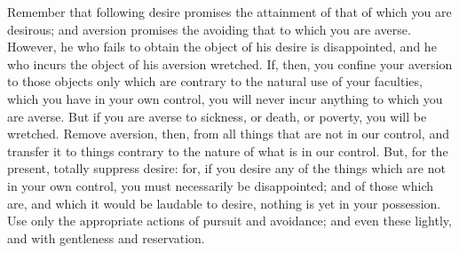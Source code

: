 Remember that following desire promises the attainment of that of which you are
desirous; and  aversion promises  the avoiding  that to  which you  are averse.
However, he who fails  to obtain the object of his  desire is disappointed, and
he who incurs the  object of his aversion wretched. If,  then, you confine your
aversion to those  objects only which are  contrary to the natural  use of your
faculties, which you have in your own control, you will never incur anything to
which you are averse. But if you  are averse to sickness, or death, or poverty,
you will be  wretched. Remove aversion, then,  from all things that  are not in
our control, and transfer it to things contrary to the nature of what is in our
control. But, for the present, totally  suppress desire: for, if you desire any
of  the things  which are  not in  your own  control, you  must necessarily  be
disappointed; and of those which are, and which it would be laudable to desire,
nothing is yet in your possession.  Use only the appropriate actions of pursuit
and avoidance; and even these lightly, and with gentleness and reservation.
